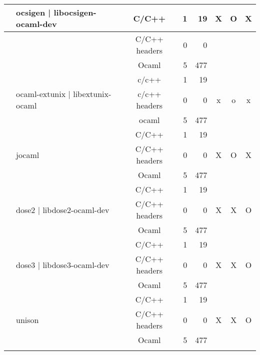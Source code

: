\documentclass[11pt,a4paper]{article}
\begin{document}
\begin{table}[h,t]
\begin{tabular}{|>{\centering}m{3cm}| m{3cm}|c|r|r| c| c|c|}
& \multirow{3}{3cm}{ocsigen | libocsigen-ocaml-dev} & C/C++ & 1 & 19 & \multirow{3}{*}{X} & \multirow{3}{*}{O} & \multirow{3}{*}{X}\\
 \cline{3-5}
 &  &                           C/C++ headers & 0 & 0 & & & \\
 \cline{3-5}
 & &                           Ocaml & 5 & 477 & & & \\
 \cline{2-8}


 &\multirow{3}{3cm}{ocaml-extunix | libextunix-ocaml} & c/c++ & 1 & 19 & \multirow{3}{*}{x} & \multirow{3}{*}{o} & \multirow{3}{*}{x}\\
 \cline{3-5}
 &  &                           c/c++ headers & 0 & 0 & & & \\
 \cline{3-5}
 & &                           ocaml & 5 & 477 & & & \\
 \cline{2-8}



 & \multirow{3}{*}{jocaml} & C/C++ & 1 & 19 & \multirow{3}{*}{X} & \multirow{3}{*}{O} & \multirow{3}{*}{X}\\
 \cline{3-5}
 &  &                           C/C++ headers & 0 & 0 & & & \\
 \cline{3-5}
 & &                           Ocaml & 5 & 477 & & & \\
 \cline{2-8}



 & \multirow{3}{3cm}{dose2 | libdose2-ocaml-dev} & C/C++ & 1 & 19 & \multirow{3}{*}{X} & \multirow{3}{*}{X} & \multirow{3}{*}{O}\\
 \cline{3-5}
 &  &                           C/C++ headers & 0 & 0 & & & \\
 \cline{3-5}
 & &                           Ocaml & 5 & 477 & & & \\
 \cline{2-8}


 & \multirow{3}{3cm}{dose3 | libdose3-ocaml-dev} & C/C++ & 1 & 19 & \multirow{3}{*}{X} & \multirow{3}{*}{X} & \multirow{3}{*}{O}\\
 \cline{3-5}
 &  &                           C/C++ headers & 0 & 0 & & & \\
 \cline{3-5}
 & &                           Ocaml & 5 & 477 & & & \\
 \cline{2-8}

 

 & \multirow{3}{*}{unison} & C/C++ & 1 & 19 & \multirow{3}{*}{X} & \multirow{3}{*}{X} & \multirow{3}{*}{O}\\
 \cline{3-5}
 &  &                           C/C++ headers & 0 & 0 & & & \\
 \cline{3-5}
 & &                           Ocaml & 5 & 477 & & & \\
 \cline{2-8}



\end{tabular}
\end{table}
\end{document}
